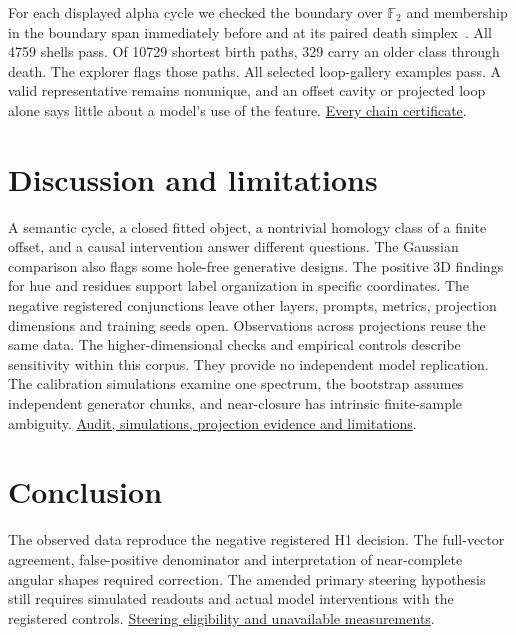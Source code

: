 \documentclass[10pt]{article}
\newcommand{\evidence}[2]{\href{https://github.com/BurnyCoder/topology-of-neural-geometry-in-llm-mechanistic-interpretability/blob/main/#1}{#2}}
\begin{document}
For each displayed alpha cycle we checked the boundary over $\mathbb F_2$ and membership in the boundary span immediately before and at its paired death simplex~\citep{edelsbrunner2010computational}. All 4759 shells pass. Of 10729 shortest birth paths, 329 carry an older class through death. The explorer flags those paths. All selected loop-gallery examples pass. A valid representative remains nonunique, and an offset cavity or projected loop alone says little about a model's use of the feature. \evidence{results/science/representatives.csv.gz}{Every chain certificate}.

\section{Discussion and limitations}

A semantic cycle, a closed fitted object, a nontrivial homology class of a finite offset, and a causal intervention answer different questions. The Gaussian comparison also flags some hole-free generative designs. The positive 3D findings for hue and residues support label organization in specific coordinates. The negative registered conjunctions leave other layers, prompts, metrics, projection dimensions and training seeds open. Observations across projections reuse the same data. The higher-dimensional checks and empirical controls describe sensitivity within this corpus. They provide no independent model replication. The calibration simulations examine one spectrum, the bootstrap assumes independent generator chunks, and near-closure has intrinsic finite-sample ambiguity. \evidence{reports/reviews/2026-11-26-scientific-audit.md}{Audit, simulations, projection evidence and limitations}.

\section{Conclusion}
The observed data reproduce the negative registered H1 decision. The full-vector agreement, false-positive denominator and interpretation of near-complete angular shapes required correction. The amended primary steering hypothesis still requires simulated readouts and actual model interventions with the registered controls. \evidence{results/science/h6_datasets.csv}{Steering eligibility and unavailable measurements}.

\appendix
\end{document}
